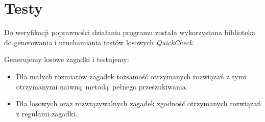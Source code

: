 \section{Testy}
Do weryfikacji poprawności działania programu została wykorzystana biblioteka
do generowania i uruchamiania testów losowych \textit{QuickCheck}. 

Generujemy losowe zagadki i testujemy:
\begin{itemize}
  \setlength\itemsep{0.1em}
    \item Dla małych rozmiarów zagadek tożsamość otrzymanych rozwiązań
        z tymi otrzymanymi naiwną metodą pełnego przeszukiwania.
    \item Dla losowych oraz rozwiązywalnych zagadek zgodność otrzymanych
        rozwiązań z regułami zagadki.
\end{itemize}
